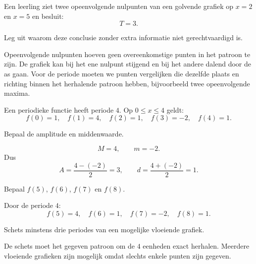 \documentclass{ximera}
\begin{document}
\begin{oefening}{\oefU\ESS}

Een leerling ziet twee opeenvolgende nulpunten van een golvende grafiek op
\(x=2\) en \(x=5\) en besluit:
\[
T=3.
\]

Leg uit waarom deze conclusie zonder extra informatie niet gerechtvaardigd is.

\begin{oplossing}
Opeenvolgende nulpunten hoeven geen overeenkomstige punten in het patroon te zijn.
De grafiek kan bij het ene nulpunt stijgend en bij het andere dalend door de as gaan.
Voor de periode moeten we punten vergelijken die dezelfde plaats en richting
binnen het herhalende patroon hebben, bijvoorbeeld twee opeenvolgende maxima.
\end{oplossing}
\end{oefening}

\begin{oefening}{\oefU\ESS}

Een periodieke functie heeft periode \(4\). Op \(0\leq x\leq4\) geldt:
\[
f(0)=1,\quad f(1)=4,\quad f(2)=1,\quad f(3)=-2,\quad f(4)=1.
\]

\begin{question}
Bepaal de amplitude en middenwaarde.
\begin{oplossing}
\[
M=4,\qquad m=-2.
\]
Dus
\[
A=\frac{4-(-2)}2=3,
\qquad
d=\frac{4+(-2)}2=1.
\]
\end{oplossing}
\end{question}

\begin{question}
Bepaal \(f(5)\), \(f(6)\), \(f(7)\) en \(f(8)\).
\begin{oplossing}
Door de periode \(4\):
\[
f(5)=4,\quad f(6)=1,\quad f(7)=-2,\quad f(8)=1.
\]
\end{oplossing}
\end{question}

\begin{question}
Schets minstens drie periodes van een mogelijke vloeiende grafiek.
\begin{oplossing}
De schets moet het gegeven patroon om de \(4\) eenheden exact herhalen.
Meerdere vloeiende grafieken zijn mogelijk omdat slechts enkele punten zijn gegeven.
\end{oplossing}
\end{question}
\end{oefening}
\end{document}
